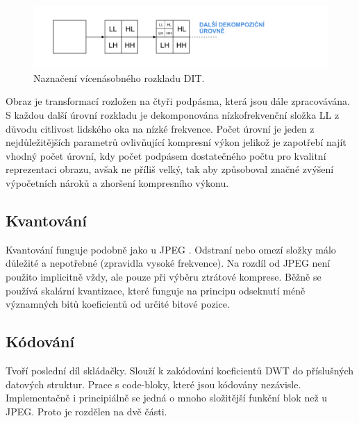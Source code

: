 \begin{figure}[hbt!]
  \centering
  \includegraphics[width=16cm]{obrazky-figures/Artboard4.pdf}
  \caption{Naznačení vícenásobného rozkladu DIT.}
  \label{retezec}
\end{figure}

\noindent Obraz je transformací rozložen na čtyři podpásma, která jsou dále zpracovávána. S každou další úrovní rozkladu je dekomponována nízkofrekvenční složka LL z důvodu citlivost lidského oka na nízké frekvence. Počet úrovní je jeden z nejdůležitějších parametrů ovlivňující kompresní výkon jelikož je zapotřebí najít vhodný počet úrovní, kdy počet podpásem dostatečného počtu pro kvalitní reprezentaci obrazu, avšak ne příliš velký, tak aby způsoboval značné zvýšení výpočetních nároků a zhoršení kompresního výkonu. 


\subsection*{Kvantování}
Kvantování funguje podobně jako u JPEG \cite{qua}. Odstraní nebo omezí složky málo důležité a nepotřebné (zpravidla vysoké frekvence). Na rozdíl od JPEG není použito implicitně vždy, ale pouze při výběru ztrátové komprese. Běžně se používá skalární kvantizace, které funguje na principu odseknutí méně významných bitů koeficientů od určité bitové pozice. 

\subsection*{Kódování}
Tvoří poslední díl skládačky. Slouží k zakódování koeficientů DWT do příslušných datových struktur. Prace s code-bloky, které jsou kódovány nezávisle. Implementačně i principiálně se jedná o mnoho složitější funkční blok než u JPEG. Proto je rozdělen na dvě části.

